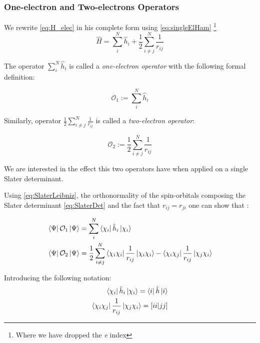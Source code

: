 \documentclass[a4paper,12pt]{article}
\newcommand{\jsqrt}[2]{\bqty{ #1 #1 | #2 #2 }}
\begin{document}
\subsubsection{One-electron and Two-electrons Operators}

We rewrite \eqref{eq:H_elec} in his complete form using \eqref{eq:singleElHam} \footnote{Where we have dropped the \textit{e} index}
\begin{equation}
	\hat{H} = \sum_{i}^{N} \hat{h}_{i} + \frac{1}{2} \sum_{i \neq j}^{N} \frac{1}{r_{ij}}
\end{equation}

The operator $\sum_{i}^{N} \hat{h}_{i}$ is called a \textit{one-electron operator} with the following formal definition:

\begin{equation}\label{eq:singleEl}
	\mathcal{O}_{1} := \sum_{i}^{N} \hat{h}_{i}
\end{equation}

Similarly, operator $\frac{1}{2} \sum_{i \neq j}^{N} \frac{1}{r_{ij}}$ is called a \textit{two-electron operator}:

\begin{equation}
	\mathcal{O}_{2} := \frac{1}{2} \sum_{i \neq j}^{N} \frac{1}{r_{ij}}
\end{equation}

We are interested in the effect this two operators have when applied on a single Slater determinant.

Using \eqref{eq:SlaterLeibniz}, the orthonormality of the spin-orbitals composing the Slater determinant \eqref{eq:SlaterDet} and the fact that $r_{ij} = r_{ji}$ one can show that \cite[p.74-81]{Attila}:

\begin{align}
	& \bra{\Psi} \mathcal{O}_{1} \ket{\Psi} = \sum_{i}^{N} \bra{\chi_{i}} \hat{h}_i \ket{\chi_{i}} \\
	& \bra{\Psi} \mathcal{O}_{2} \ket{\Psi} = \frac{1}{2} \sum_{i \neq j}^{N} \bra{\chi_i \chi_i} \frac{1}{r_{ij}} \ket{ \chi_{i} \chi_{i}} - \bra{\chi_i \chi_j} \frac{1}{r_{ij}} \ket{ \chi_{j} \chi_{i}}
\end{align}

Introducing the following notation:
\begin{align}
	\bra{\chi_{i}} \hat{h}_i \ket{\chi_{i}} = \bra{i} \hat{h} \ket{i}
	\\
	\bra{\chi_{i} \chi_{j}} \frac{1}{r_{ij}} \ket{ \chi_{j} \chi_{i}} = \jsqrt{i}{j}
\end{align}
\end{document}
